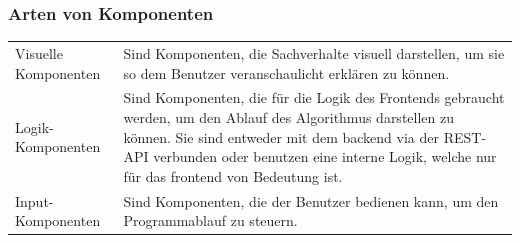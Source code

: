 \documentclass[a4paper,10.2pt,pdftex]{scrartcl}%
\begin{document}
\subsubsection{Arten von Komponenten}
\begin{tabularx}{\textwidth}{p{3cm}p{8.5cm}} 
Visuelle Komponenten &  Sind Komponenten, die Sachverhalte visuell darstellen, um sie so dem Benutzer veranschaulicht erklären zu können. \\
Logik-Komponenten & Sind Komponenten, die für die Logik des Frontends gebraucht werden, um den Ablauf des Algorithmus darstellen zu können. Sie sind entweder mit dem backend via der REST-API verbunden oder benutzen eine interne Logik, welche nur für das frontend von Bedeutung ist. \\
Input-Komponenten & Sind Komponenten, die der Benutzer bedienen kann, um den Programmablauf zu steuern.
\end{tabularx}
\end{document}
